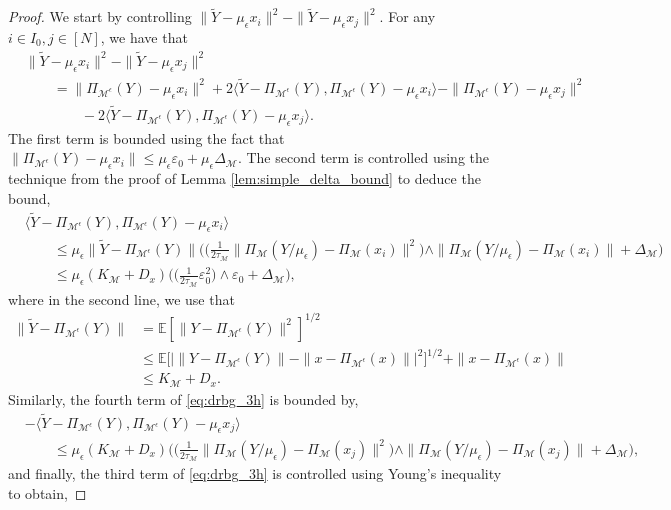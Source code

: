 \documentclass[10pt,a4paper]{amsart}
\newcommand{\E}{\mathbb{E}}
\newcommand{\M}{{\mathcal{M}}}
\newcommand{\Pieps}{\Pi_{\M^\epsilon}}
\newcommand{\gap}{\Delta_\M}
\begin{document}
\begin{proof}
We start by controlling \(\|\tilde{Y} - \mu_\epsilon x_i\|^2-\|\tilde{Y} - \mu_\epsilon x_j\|^2\). For any \(i \in I_0, j \in [N]\), we have that
\begin{align}
    &\|\tilde{Y} - \mu_\epsilon x_i\|^2-\|\tilde{Y} - \mu_\epsilon x_j\|^2\nonumber\\
    & \qquad = \| \Pieps(Y) - \mu_\epsilon x_i\|^2  + 2 \langle \tilde{Y} - \Pieps(Y), \Pieps(Y) - \mu_\epsilon x_i \rangle - \|\Pieps(Y) - \mu_\epsilon x_j\|^2\nonumber\\
    & \qquad \qquad - 2 \langle \tilde{Y} - \Pieps(Y), \Pieps(Y) - \mu_\epsilon x_j \rangle.\label{eq:drbg_3h}
\end{align}
The first term is bounded using the fact that \(\|\Pieps(Y) - \mu_\epsilon x_i\| \leq \mu_\epsilon \varepsilon_0 + \mu_\epsilon \gap\). The second term is controlled using the technique from the proof of Lemma \ref{lem:simple_delta_bound} to deduce the bound,
\begin{align}
    &\langle \tilde{Y} - \Pieps(Y), \Pieps(Y) - \mu_\epsilon x_i \rangle\\
    & \qquad \leq \mu_\epsilon \|\tilde{Y} - \Pieps(Y)\| \Big ( \big ( \tfrac{1}{2\tau_\M} \|\Pi_\M(Y/\mu_\epsilon) - \Pi_\M(x_i)\|^2 \big ) \wedge \|\Pi_\M(Y/\mu_\epsilon) - \Pi_\M(x_i)\| + \gap \Big )\nonumber\\
    & \qquad \leq \mu_\epsilon (K_\M + D_x) \Big ( \big ( \tfrac{1}{2\tau_\M} \varepsilon_0^2 \big ) \wedge \varepsilon_0 + \gap \Big ),\label{eq:drbg_3hh}
\end{align}
where in the second line, we use that
\begin{align*}
    \|\tilde{Y} - \Pieps(Y)\| &= \E[\|Y - \Pieps(Y)\|^2]^{1/2} \\
    &\leq \E \Big [ \big | \|Y - \Pieps(Y)\| - \|x - \Pieps(x)\| \big |^2 \Big ]^{1/2} + \|x - \Pieps(x)\|\\
    &\leq K_\M + D_x.
\end{align*}
Similarly, the fourth term of \eqref{eq:drbg_3h} is bounded by,
\begin{align}
    &-\langle \tilde{Y} - \Pieps(Y), \Pieps(Y) - \mu_\epsilon x_j \rangle \nonumber\\
    & \qquad \leq \mu_\epsilon (K_\M + D_x) \Big ( \big ( \tfrac{1}{2\tau_\M} \|\Pi_\M(Y/\mu_\epsilon) - \Pi_\M(x_j)\|^2 \big ) \wedge \|\Pi_\M(Y/\mu_\epsilon) - \Pi_\M(x_j)\| + \gap \Big ),\label{eq:drbg_4h}
\end{align}
and finally, the third term of \eqref{eq:drbg_3h} is controlled using Young's inequality to obtain,

\end{proof}
\end{document}
